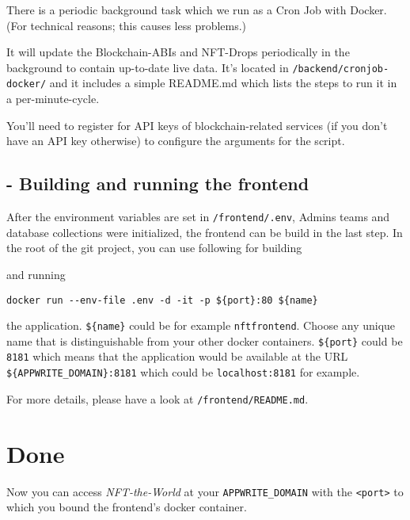 \documentclass[
]{article}
\newenvironment{Shaded}{}{}
\newcommand{\ExtensionTok}[1]{#1}
\newcommand{\NormalTok}[1]{#1}
\newcommand{\VariableTok}[1]{\textcolor[rgb]{0.10,0.09,0.49}{#1}}
\begin{document}
There is a periodic background task which we run as a Cron Job with
Docker. (For technical reasons; this causes less problems.)

It will update the Blockchain-ABIs and NFT-Drops periodically in the
background to contain up-to-date live data. It's located in
\texttt{/backend/cronjob-docker/} and it includes a simple README.md
which lists the steps to run it in a per-minute-cycle.

You'll need to register for API keys of blockchain-related services (if
you don't have an API key otherwise) to configure the arguments for the
script.

\hypertarget{building-and-running-the-frontend}{%
\subsection{- Building and running the
frontend}\label{building-and-running-the-frontend}}

After the environment variables are set in \texttt{/frontend/.env},
Admins teams and database collections were initialized, the frontend can
be build in the last step. In the root of the git project, you can use
following for building

\begin{Shaded}
\end{Shaded}

and running

\begin{verbatim}
docker run --env-file .env -d -it -p ${port}:80 ${name}
\end{verbatim}

the application. \texttt{\$\{name\}} could be for example
\texttt{nftfrontend}. Choose any unique name that is distinguishable
from your other docker containers. \texttt{\$\{port\}} could be
\texttt{8181} which means that the application would be available at the
URL \texttt{\$\{APPWRITE\_DOMAIN\}:8181} which could be
\texttt{localhost:8181} for example.

For more details, please have a look at \texttt{/frontend/README.md}.

\hypertarget{done}{%
\section{Done}\label{done}}

Now you can access \emph{NFT-the-World} at your
\texttt{APPWRITE\_DOMAIN} with the
\texttt{\textless{}port\textgreater{}} to which you bound the frontend's
docker container.
\end{document}
